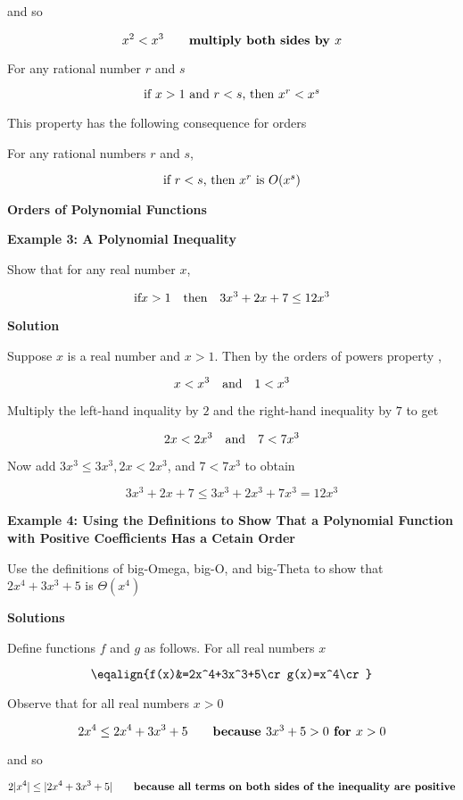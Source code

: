 and so

$$x^2<x^3\qquad\hbox{\bf multiply both sides by $x$}$$

For any rational number $r$ and $s$

$$\hbox{if $x>1$ and $r<s$, then $x^r<x^s$}$$

This property has the following consequence for orders

For any rational numbers $r$ and $s$,

$$\hbox{if $r<s$, then $x^r$ is $O(x^s)$}$$

\filbreak
\vskip 1cm
{\bf Orders of Polynomial Functions}

\vskip 3mm
{\bf Example 3: A Polynomial Inequality}

\vskip 1mm
Show that for any real number $x$,

$$\hbox{if} x>1\quad\hbox{then}\quad 3x^3+2x+7\leq 12x^3$$

\vskip 3mm
{\bf Solution}

\vskip 1mm
Suppose $x$ is a real number and $x>1$. Then by the orders of powers property ,

$$x<x^3\quad\hbox{and}\quad 1<x^3$$

Multiply the left-hand inquality by $2$ and the right-hand inequality by $7$ to get

$$2x<2x^3\quad\hbox{and}\quad 7<7x^3$$

Now add $3x^3\leq3x^3, 2x<2x^3$, and $7<7x^3$ to obtain

$$3x^3+2x+7\leq 3x^3+2x^3+7x^3=12x^3$$

\filbreak
\vskip 1cm
{\bf Example 4: Using the Definitions to Show That a Polynomial Function with Positive Coefficients Has a Cetain Order}

\vskip 1mm
Use the definitions of big-Omega, big-O, and big-Theta to show that $2x^4+3x^3+5$ is $\Theta(x^4)$

\vskip 3mm
{\bf Solutions}

\vskip 1mm
Define functions $f$ and $g$ as follows. For all real numbers $x$

$$\eqalign{f(x)&=2x^4+3x^3+5\cr
	g(x)=x^4\cr}$$

Observe that for all real numbers $x>0$

$$2x^4\leq 2x^4+3x^3+5\qquad\hbox{\bf because $3x^3+5>0$ for $x>0$}$$

and so

$$2|x^4|\leq|2x^4+3x^3+5|\qquad\hbox{\bf because all terms on both sides of the inequality are positive}$$

